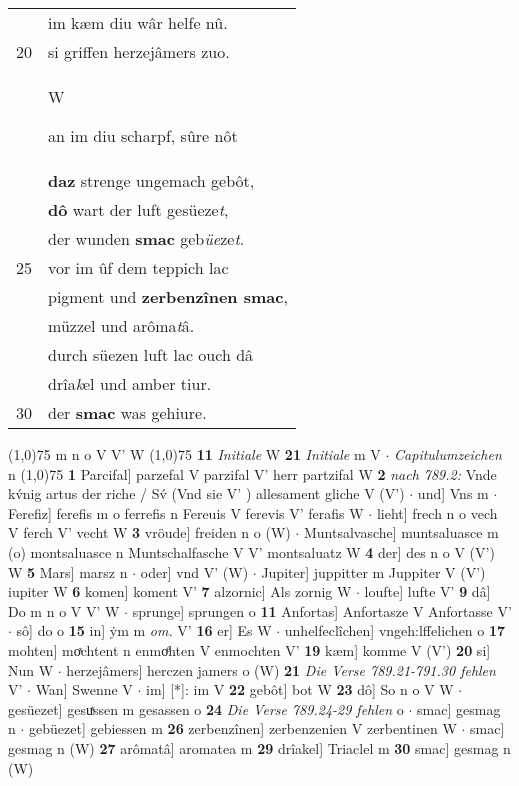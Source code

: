 \documentclass[8pt,a4paper,notitlepage]{article}
\begin{document}
\begin{table}[ht]
\begin{minipage}[t]{0.5\linewidth}
\begin{tabular}{rl}
 & im kæm diu wâr helfe nû.\\ 
20 & si griffen herzejâmers zuo.\\ 
 & \begin{large}W\end{large}an im diu scharpf, sûre nôt\\ 
 & \textbf{daz} strenge ungemach gebôt,\\ 
 & \textbf{dô} wart der luft gesüeze\textit{t},\\ 
 & der wunden \textbf{smac} geb\textit{üe}ze\textit{t}.\\ 
25 & vor im ûf dem teppich lac\\ 
 & pigment und \textbf{zerbenzînen smac},\\ 
 & müzzel und arôma\textit{t}â.\\ 
 & durch süezen luft lac ouch dâ\\ 
 & drîa\textit{k}el und amber tiur.\\ 
30 & der \textbf{smac} was gehiure.\\ 
\end{tabular}
\scriptsize
\line(1,0){75} \newline
m n o V V' W \newline
\line(1,0){75} \newline
\textbf{11} \textit{Initiale} W  \textbf{21} \textit{Initiale} m V   $\cdot$ \textit{Capitulumzeichen} n  \newline
\line(1,0){75} \newline
\textbf{1} Parcifal] parzefal V parzifal V' herr partzifal W \textbf{2} \textit{nach 789.2:} Vnde kv́nig artus der riche / Sv́ (Vnd sie V'  ) allesament gliche V (V')   $\cdot$ und] Vns m  $\cdot$ Ferefiz] ferefis m o ferrefis n Fereuis V ferevis V' ferafis W  $\cdot$ lieht] frech n o vech V ferch V' vecht W \textbf{3} vröude] freiden n o (W)  $\cdot$ Muntsalvasche] muntsaluasce m (o) montsaluasce n Muntschalfasche V V' montsaluatz W \textbf{4} der] des n o V (V') W \textbf{5} Mars] marsz n  $\cdot$ oder] vnd V' (W)  $\cdot$ Jupiter] juppitter m Juppiter V (V') iupiter W \textbf{6} komen] koment V' \textbf{7} alzornic] Als zornig W  $\cdot$ loufte] lufte V' \textbf{9} dâ] Do m n o V V' W  $\cdot$ sprunge] sprungen o \textbf{11} Anfortas] Anfortasze V Anfortasse V'  $\cdot$ sô] do o \textbf{15} in] ẏm m \textit{om.} V' \textbf{16} er] Es W  $\cdot$ unhelfeclîchen] vngeh:lffelichen o \textbf{17} mohten] moͯchtent n enmoͤhten V enmochten V' \textbf{19} kæm] komme V (V') \textbf{20} si] Nun W  $\cdot$ herzejâmers] herczen jamers o (W) \textbf{21} \textit{Die Verse 789.21-791.30 fehlen} V'   $\cdot$ Wan] Swenne V  $\cdot$ im] [*]: im V \textbf{22} gebôt] bot W \textbf{23} dô] So n o V W  $\cdot$ gesüezet] gesuͯssen m gesassen o \textbf{24} \textit{Die Verse 789.24-29 fehlen} o   $\cdot$ smac] gesmag n  $\cdot$ gebüezet] gebiessen m \textbf{26} zerbenzînen] zerbenzenien V zerbentinen W  $\cdot$ smac] gesmag n (W) \textbf{27} arômatâ] aromatea m \textbf{29} drîakel] Triaclel m \textbf{30} smac] gesmag n (W) \newline
\end{minipage}
\end{table}
\end{document}

